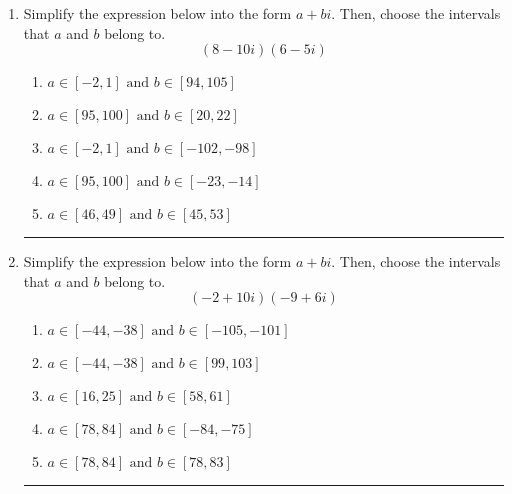 \documentclass[14pt]{extbook}
\newcommand{\litem}[1]{\item#1\hspace*{-1cm}\rule{\textwidth}{0.4pt}}
\begin{document}
\begin{enumerate}
{\begin{enumerate}[label=\Alph*.]
\end{enumerate} }
\litem{
Simplify the expression below into the form $a+bi$. Then, choose the intervals that $a$ and $b$ belong to.\[ (8 - 10 i)(6 - 5 i) \]\begin{enumerate}[label=\Alph*.]
\item \( a \in [-2, 1] \text{ and } b \in [94, 105] \)
\item \( a \in [95, 100] \text{ and } b \in [20, 22] \)
\item \( a \in [-2, 1] \text{ and } b \in [-102, -98] \)
\item \( a \in [95, 100] \text{ and } b \in [-23, -14] \)
\item \( a \in [46, 49] \text{ and } b \in [45, 53] \)

\end{enumerate} }
\litem{
Simplify the expression below into the form $a+bi$. Then, choose the intervals that $a$ and $b$ belong to.\[ (-2 + 10 i)(-9 + 6 i) \]\begin{enumerate}[label=\Alph*.]
\item \( a \in [-44, -38] \text{ and } b \in [-105, -101] \)
\item \( a \in [-44, -38] \text{ and } b \in [99, 103] \)
\item \( a \in [16, 25] \text{ and } b \in [58, 61] \)
\item \( a \in [78, 84] \text{ and } b \in [-84, -75] \)
\item \( a \in [78, 84] \text{ and } b \in [78, 83] \)

\end{enumerate} }
\end{enumerate}
\end{document}
